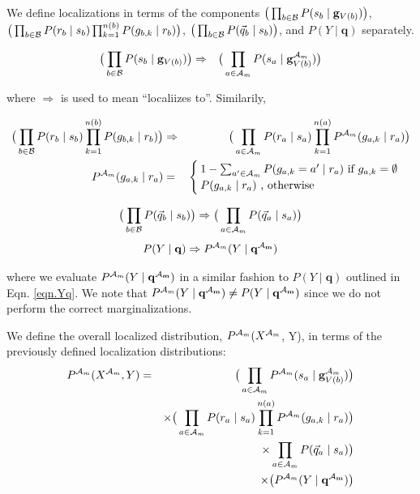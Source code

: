 \documentclass[11pt]{article}
\newcommand{\A}{{\cal A}}
\newcommand{\B}{\cal B}
\newcommand{\Am}{\A_{m}}
\newcommand{\qb}{\vec{q}_b}
\newcommand{\qa}{\vec{q}_a}
\begin{document}
We define localizations in terms of the components $\big( \prod_{b \in {\B}} P(s_b \mid \mathbf{g}_{V(b)}) \big )$, $\big( \prod_{b \in {\B}} P(r_b \mid s_b) \prod_{k=1}^{n(b)} P(g_{b,k} \mid r_b) \big)$, $\big( \prod_{b \in {\B}} P(\qb \mid s_b)\big)$, and $P(Y \mid \mathbf{q})$ separately.

\begin{eqnarray}
\big(\prod_{b \in {\B}} P(s_b \mid \mathbf{g}_{V(b)}) \big ) &\Rightarrow& \big(\prod_{a \in {\Am}} P(s_a \mid \mathbf{g}^{\Am}_{V({b})}) \big )
\end{eqnarray}

where $\Rightarrow$ is used to mean ``localiizes to''. Similarily, 

\begin{eqnarray}
\big( \prod_{b \in {\B}} P(r_b \mid s_b) \prod_{k=1}^{n(b)} P(g_{b,k} \mid r_b) \big) &\Rightarrow& \big( \prod_{a \in \Am} P(r_a \mid s_a) \prod_{k=1}^{n(a)} P^{\Am}(g_{a,k} \mid r_a) \big) \\
%
P^{\Am}(g_{a,k} \mid r_a) &=& \begin{cases} \label{actPg} 1-\sum_{a' \in {\Am}} P(g_{a,k} = a' \mid r_a) \mbox{ if } g_{a,k} = \emptyset \\
 P(g_{a,k} \mid r_a) \mbox{ , otherwise } \end{cases}
\end{eqnarray}

\begin{eqnarray}
\big( \prod_{b \in {\B}} P(\qb \mid s_b)\big) \Rightarrow \big( \prod_{a \in {\Am}} P(\qa \mid s_a)\big)
\end{eqnarray}
\begin{eqnarray}
P(Y \mid \mathbf{q}) \Rightarrow P^{\Am}(Y \mid \mathbf{q^{\Am}})
\end{eqnarray}

where we evaluate $P^{\Am}(Y \mid \mathbf{q^{\Am}})$ in a similar fashion to $P(Y \mid \mathbf{q})$ outlined in Eqn. \ref{eqn.Yq}. We note that $P^{\Am}(Y \mid \mathbf{q^{\Am}}) \neq P(Y \mid \mathbf{q^{\Am}})$ since we do not perform the correct marginalizations.

We define the overall localized distribution, $P^{\Am}(X^{\Am}$, Y), in terms of the previously defined localization distributions:
\begin{eqnarray}
P^{\Am}(X^{\Am}, Y)
&=& \big(\prod_{a \in {\Am}} P^{\Am}(s_a \mid \mathbf{g}^{\Am}_{V({b})}) \big ) \label{eqn.localJoint}\\
& & \times \big( \prod_{a \in {\Am}} P(r_a \mid s_a) \prod_{k=1}^{n(a)} P^{\Am}(g_{a,k} \mid r_a) \big) \nonumber \\
& & \times \prod_{a \in {\Am}} P(\qa \mid s_a)\big) \nonumber \\
& & \times \big( P^{\Am}(Y \mid \mathbf{q^{\Am}}) \big) \nonumber
\end{eqnarray}
\end{document}
